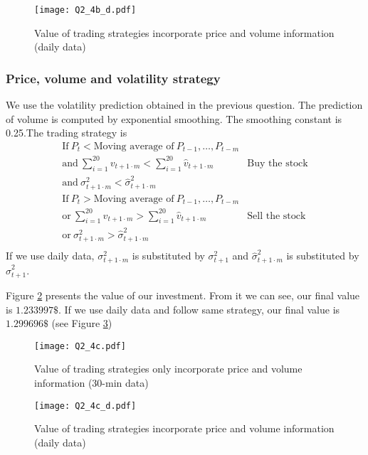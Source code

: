 \documentclass[11pt]{article}
\begin{document}
\begin{figure}
\texttt{[image: Q2\_4b\_d.pdf]}
\caption{Value of trading strategies incorporate price and volume information (daily data)}\label{Q2_4b_d}
\end{figure}
\subsubsection{Price, volume and volatility strategy}

We use the volatility prediction obtained in the previous question. The prediction of volume is computed by exponential smoothing. The smoothing constant is 0.25.The trading strategy is
\begin{eqnarray*}
\text{If}~P_t<\text{Moving average of}~P_{t-1},\ldots,P_{t-m}&\\
\text{and}~\sum_{i=1}^{20} v_{t+1\cdot m}<\sum_{i=1}^{20} \hat{v}_{t+1\cdot m}&\text{Buy the stock}\\
\text{and}~\sigma^2_{t+1\cdot m}<\hat{\sigma}^2_{t+1\cdot m}&\\
\text{If}~P_t>\text{Moving average of}~P_{t-1},\ldots,P_{t-m}&\\
\text{or}~\sum_{i=1}^{20} v_{t+1\cdot m}>\sum_{i=1}^{20} \hat{v}_{t+1\cdot m}&\text{Sell the stock}\\
\text{or}~\sigma^2_{t+1\cdot m}>\hat{\sigma}^2_{t+1\cdot m}&\\
\end{eqnarray*}
If we use daily data, $\sigma^2_{t+1\cdot m}$ is substituted by $\sigma^2_{t+1}$ and $\hat{\sigma}^2_{t+1\cdot m}$ is substituted by $\hat{\sigma}^2_{t+1}$.

Figure \ref{Q2_4c} presents the value of our investment. From it we can see, our final value is $1.233997\$$. If we use daily data and follow same strategy, our final value is $1.299696\$$ (see Figure \ref{Q2_4c_d})

\begin{figure}
\texttt{[image: Q2\_4c.pdf]}
\caption{Value of trading strategies only incorporate price and volume information (30-min data)}\label{Q2_4c}
\end{figure}

\begin{figure}
\texttt{[image: Q2\_4c\_d.pdf]}
\caption{Value of trading strategies incorporate price and volume information (daily data)}\label{Q2_4c_d}
\end{figure}
\end{document}
